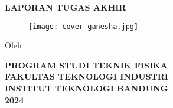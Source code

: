 \clearpage
\pagestyle{empty}

\begin{center}
	\smallskip
	
	\begin{singlespace}
		\large \MakeUppercase{\bfseries \thetitle}
	\end{singlespace}
	
	\vfill
	
	\large \MakeUppercase{\bfseries Laporan Tugas Akhir}
	
	\vfill
	
	\begin{figure}[h]
		\centering
		\texttt{[image: cover-ganesha.jpg]}
	\end{figure}
	
	\vfill
	
	
	
	\small{
		Oleh
		
		\theauthor
	}
	
	\vfill
	
	\begin{singlespace}
		\large
		\uppercase{
			\bfseries
			Program Studi Teknik Fisika \\
			Fakultas Teknologi Industri \\
			Institut Teknologi Bandung \\
			2024
		}
	\end{singlespace}
	
	
	\vfill
	
\end{center}

\clearpage
